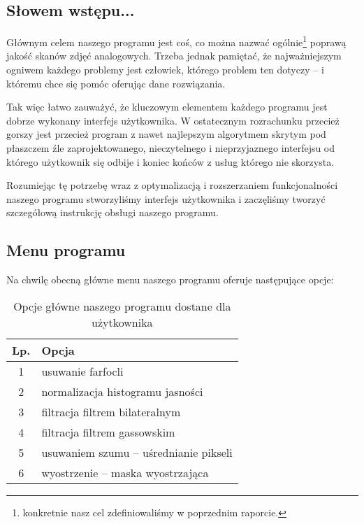 \documentclass[]{mwart}
\begin{document}
\subsection{Słowem wstępu...}
Głównym celem naszego programu jest coś, co można nazwać
ogólnie\footnote{konkretnie nasz cel zdefiniowaliśmy w poprzednim raporcie.}
poprawą jakość skanów zdjęć analogowych. Trzeba jednak pamiętać,
że najważniejszym ogniwem każdego problemy jest człowiek, którego
problem ten dotyczy -- i któremu chce się pomóc oferując dane rozwiązania. \newline

Tak więc łatwo zauważyć, że kluczowym elementem każdego programu jest dobrze wykonany
interfejs użytkownika. W ostatecznym rozrachunku przecież gorszy
jest przecież program z nawet najlepszym algorytmem skrytym pod płaszczem źle zaprojektowanego,
nieczytelnego i nieprzyjaznego interfejsu od którego użytkownik się odbije
i koniec końców z usług którego nie skorzysta. \newline

Rozumiejąc tę potrzebę wraz z optymalizacją i rozszerzaniem funkcjonalności
naszego programu stworzyliśmy interfejs użytkownika i zaczęliśmy %
tworzyć szczegółową instrukcję obsługi naszego programu.

\subsection{Menu programu}
Na chwilę obecną główne menu naszego programu oferuje następujące opcje:

\begin{table}[h]
    \centering
    \begin{tabular}{|c|l|}
        \hline
        Lp. & Opcja                                  \\ \hline
        1   & usuwanie farfocli                      \\ \hline      %
        2   & normalizacja histogramu jasności       \\ \hline      %
        3   & filtracja filtrem bilateralnym         \\ \hline      %
        4   & filtracja filtrem gassowskim           \\ \hline      %
        5   & usuwaniem szumu -- uśrednianie pikseli \\ \hline      %
        6   & wyostrzenie -- maska wyostrzająca      \\ \hline      %
    \end{tabular}
    \caption{Opcje główne naszego programu dostane dla użytkownika}
\end{table}
\end{document}
